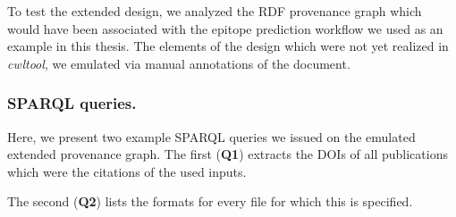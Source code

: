 To test the extended design, we analyzed the RDF provenance graph which would have been associated with the epitope prediction workflow we used as an example in this thesis. The elements of the design which were not yet realized in \emph{cwltool}, we emulated via manual annotations of the document. 

\subsubsection{SPARQL queries.}

Here, we present two example SPARQL queries we issued on the emulated extended provenance graph. The first (\textbf{Q1}) extracts the DOIs of all publications which were the citations of the used inputs.

The second (\textbf{Q2}) lists the formats for every file for which this is specified.
